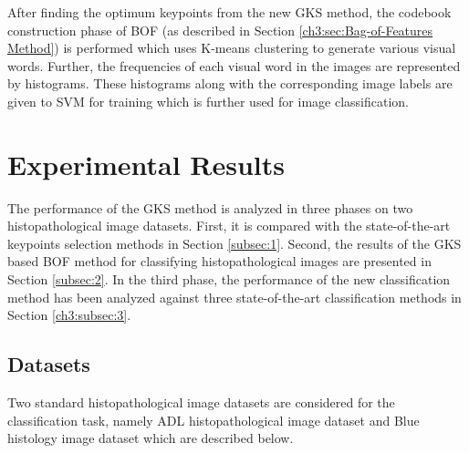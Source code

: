 After finding the optimum keypoints from the new GKS method, the codebook construction phase of BOF (as described in Section \ref{ch3:sec:Bag-of-Features Method}) is performed which uses K-means clustering to generate various visual words. Further, the frequencies of each visual word in the images are represented by histograms. These histograms along with the corresponding image labels are given to  SVM for training which is further used for image classification.

\section{Experimental Results} \label{ch3:sec:expr}

The performance of the GKS method is analyzed in three phases on two histopathological image datasets. First, it is compared with the state-of-the-art keypoints selection methods in Section \ref{subsec:1}. Second, the results of the GKS based BOF method for classifying histopathological images are presented in Section \ref{subsec:2}. In the third phase, the performance of the new classification method has been analyzed against three state-of-the-art classification methods in Section \ref{ch3:subsec:3}. 

\subsection{Datasets}\label{ch3:subsec:dataset}
Two standard histopathological image datasets are considered for the classification task, namely ADL histopathological image dataset and Blue histology image dataset which are described below.

